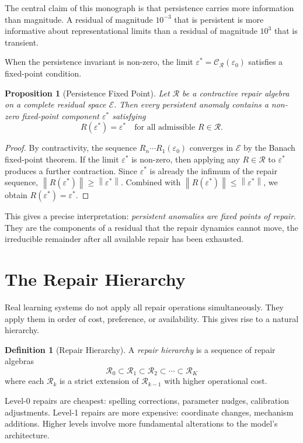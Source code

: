 \documentclass[12pt,oneside]{book}
\theoremstyle{plain}
\newtheorem{proposition}[theorem]{Proposition}
\theoremstyle{definition}
\newtheorem{definition}[theorem]{Definition}
\theoremstyle{remark}
\newcommand{\R}{\mathcal{R}}
\newcommand{\eps}{\varepsilon}
\newcommand{\norm}[1]{\left\lVert #1 \right\rVert}
\newcommand{\1}{\mathbf{1}}
\begin{document}
The central claim of this monograph is that persistence carries more information than magnitude. A residual of magnitude $10^{-3}$ that is persistent is more informative about representational limits than a residual of magnitude $10^3$ that is transient.

When the persistence invariant is non-zero, the limit $\eps^* = \mathcal{C}_{\R}(\eps_0)$ satisfies a fixed-point condition.

\begin{proposition}[Persistence Fixed Point]
\label{prop:fixedpoint}
Let $\R$ be a contractive repair algebra on a complete residual space $\mathcal{E}$. Then every persistent anomaly contains a non-zero fixed-point component $\eps^*$ satisfying
\[
R(\eps^*) = \eps^* \quad \text{for all admissible } R \in \R.
\]
\end{proposition}

\begin{proof}
By contractivity, the sequence $R_n \cdots R_1(\eps_0)$ converges in $\mathcal{E}$ by the Banach fixed-point theorem. If the limit $\eps^*$ is non-zero, then applying any $R \in \R$ to $\eps^*$ produces a further contraction. Since $\eps^*$ is already the infimum of the repair sequence, $\norm{R(\eps^*)} \geq \norm{\eps^*}$. Combined with $\norm{R(\eps^*)} \leq \norm{\eps^*}$, we obtain $R(\eps^*) = \eps^*$.
\end{proof}

This gives a precise interpretation: \emph{persistent anomalies are fixed points of repair}. They are the components of a residual that the repair dynamics cannot move, the irreducible remainder after all available repair has been exhausted.

\section{The Repair Hierarchy}

Real learning systems do not apply all repair operations simultaneously. They apply them in order of cost, preference, or availability. This gives rise to a natural hierarchy.

\begin{definition}[Repair Hierarchy]
A \emph{repair hierarchy} is a sequence of repair algebras
\[
\R_0 \subset \R_1 \subset \R_2 \subset \cdots \subset \R_K
\]
where each $\R_k$ is a strict extension of $\R_{k-1}$ with higher operational cost.
\end{definition}

Level-0 repairs are cheapest: spelling corrections, parameter nudges, calibration adjustments. Level-1 repairs are more expensive: coordinate changes, mechanism additions. Higher levels involve more fundamental alterations to the model's architecture.
\end{document}
